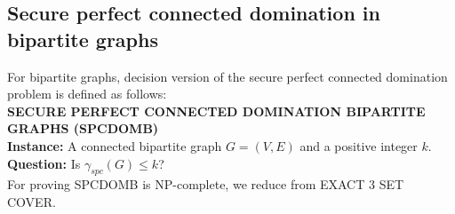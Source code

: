 \subsection{Secure perfect connected domination in bipartite graphs}
\noindent  
For bipartite graphs, decision version of the secure perfect connected domination problem is defined as follows:\\
\textbf{SECURE PERFECT CONNECTED DOMINATION BIPARTITE GRAPHS (SPCDOMB)}\\
\indent \textbf{Instance:} \hspace{1ex}A connected bipartite graph $G=(V,E)$ and a positive integer $k$.\\
\indent \textbf{Question:} Is $\gamma_{spc}(G) \leq k$?\\
For proving SPCDOMB is NP-complete, we reduce from EXACT 3 SET COVER.

